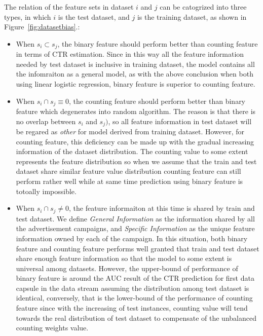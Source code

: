 \documentclass{sig-alternate}
\begin{document}
The relation of the feature sets in dataset \(i\) and \(j\) can be catogrized into three types, in which \(i\) is the test dataset, and \(j\) is the training dataset, as shown in Figure~\ref{fig:datasetbias}.:
\begin{itemize}
\item When \(s_i \subset s_j\), the binary feature should perform better than counting feature in terms of CTR estimation. Since in this way all the feature information needed by test dataset is inclusive in training dataset, the model contains all the infomraiton as a general model, as with the above conclusion when both using linear logistic regression, binary feature is superior to counting feature.  
\item When \(s_i \cap s_j \equiv 0\), the counting feature should perform better than binary feature which degenerates into random algorithm. The reason is that there is no overlap between \(s_i\) and \(s_j)\), so all feature information in test dataset will be regared as \textit{other} for model derived from training dataset. However, for counting feature, this deficiency can be made up with the gradual increasing information of the dataset distribution. The counting value to some extent represents the feature distribution so when we assume that the train and test dataset share similar feature value distribution counting feature can still perform rather well while at same time prediction using binary feature is totoally impossible.
\item When \(s_i \cap s_j \neq 0\), the feature informaiton at this time is shared by train and test dataset. We define \textit{General Information} as the information shared by all the advertisement campaigns, and \textit{Specific Information} as the unique feature information owned by each of the campaign. In this situation, both binary feature and counting feature performs well granted that train and test dataset share enough feature information so that the model to some extent is universal among datasets. However, the upper-bound of performance of binary feature is around the AUC result of the CTR prediction for first data capsule in the data stream assuming the distribution among test dataset is identical, conversely, that is the lower-bound of the performance of counting feature since with the increasing of test instances, counting value will tend towards the real distribution of test dataset to compensate of the unbalanced counting weights value. 
\end{itemize}
\end{document}
